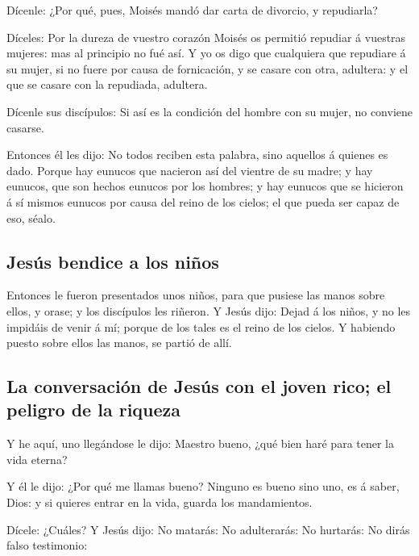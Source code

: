  Dícenle: ¿Por qué, pues, Moisés mandó dar carta de
divorcio, y repudiarla?

 Díceles: Por la dureza de vuestro corazón Moisés os
permitió repudiar á vuestras mujeres: mas al principio no fué así.
 Y yo os digo que cualquiera que repudiare á su mujer, si no
fuere por causa de fornicación, y se casare con otra, adultera: y el que
se casare con la repudiada, adultera.

 Dícenle sus discípulos: Si así es la condición del hombre
con su mujer, no conviene casarse.

 Entonces él les dijo: No todos reciben esta palabra, sino
aquellos á quienes es dado.  Porque hay eunucos que
nacieron así del vientre de su madre; y hay eunucos, que son hechos
eunucos por los hombres; y hay eunucos que se hicieron á sí mismos
eunucos por causa del reino de los cielos; el que pueda ser capaz de
eso, séalo.

\hypertarget{jesuxfas-bendice-a-los-niuxf1os}{%
\subsection{Jesús bendice a los
niños}\label{jesuxfas-bendice-a-los-niuxf1os}}

 Entonces le fueron presentados unos niños, para que
pusiese las manos sobre ellos, y orase; y los discípulos les riñeron.
 Y Jesús dijo: Dejad á los niños, y no les impidáis de
venir á mí; porque de los tales es el reino de los cielos. 
Y habiendo puesto sobre ellos las manos, se partió de allí.

\hypertarget{la-conversaciuxf3n-de-jesuxfas-con-el-joven-rico-el-peligro-de-la-riqueza}{%
\subsection{La conversación de Jesús con el joven rico; el peligro de la
riqueza}\label{la-conversaciuxf3n-de-jesuxfas-con-el-joven-rico-el-peligro-de-la-riqueza}}

 Y he aquí, uno llegándose le dijo: Maestro bueno, ¿qué
bien haré para tener la vida eterna?

 Y él le dijo: ¿Por qué me llamas bueno? Ninguno es bueno
sino uno, es á saber, Dios: y si quieres entrar en la vida, guarda los
mandamientos.

 Dícele: ¿Cuáles? Y Jesús dijo: No matarás: No adulterarás:
No hurtarás: No dirás falso testimonio:

